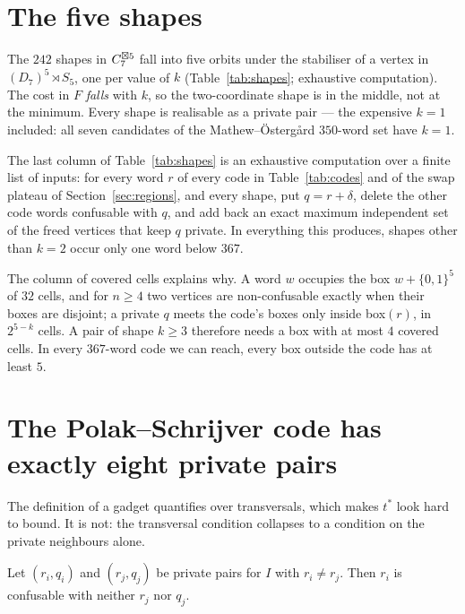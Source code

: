\section{The five shapes}
\label{sec:shapes}



The $242$ shapes in $C_7^{\boxtimes 5}$ fall into five orbits under the stabiliser of a vertex in
$(D_7)^5\rtimes S_5$, one per value of $k$ (Table~\ref{tab:shapes}; exhaustive computation). The
cost in $F$ \emph{falls} with $k$, so the two-coordinate shape is in the middle, not at the minimum.
Every shape is realisable as a private pair --- the expensive $k=1$ included: all seven candidates
of the Mathew--\"Osterg{\aa}rd $350$-word set \cite{mathew2017} have $k=1$.

The last column of Table~\ref{tab:shapes} is an exhaustive computation over a finite list of
inputs: for every word $r$ of every code in Table~\ref{tab:codes} and of the swap plateau of
Section~\ref{sec:regions}, and every shape, put $q=r+\delta$, delete the other code words
confusable with $q$, and add back an exact maximum independent set of the freed vertices that keep
$q$ private. In everything this produces, shapes other than $k=2$ occur only one word below $367$.

The column of covered cells explains why. A word $w$ occupies the box $w+\{0,1\}^5$ of $32$
cells, and for $n\ge4$ two vertices are non-confusable exactly when their boxes are disjoint; a
private $q$ meets the code's boxes only inside box$(r)$, in $2^{5-k}$ cells. A pair of shape
$k\ge3$ therefore needs a box with at most $4$ covered cells. In every $367$-word code we can
reach, every box outside the code has at least $5$.

\section{The Polak--Schrijver code has exactly eight private pairs}
\label{sec:pscode}

The definition of a gadget quantifies over transversals, which makes $t^*$ look hard to bound.
It is not: the transversal condition collapses to a condition on the private neighbours alone.

\begin{lemma}
\label{lem:nomix}
Let $(r_i,q_i)$ and $(r_j,q_j)$ be private pairs for $I$ with $r_i\neq r_j$. Then $r_i$ is
confusable with neither $r_j$ nor $q_j$.
\end{lemma}

